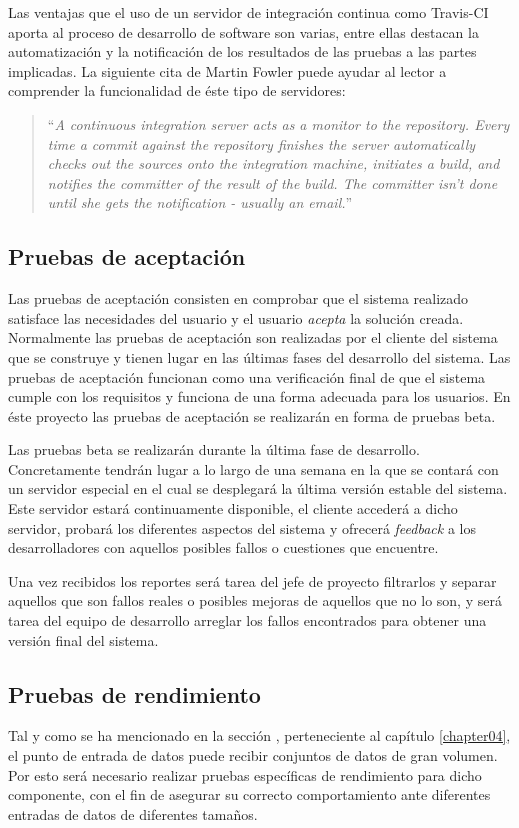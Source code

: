 Las ventajas que el uso de un servidor de integración continua como Travis-CI aporta al proceso de desarrollo de software son varias, entre ellas destacan la automatización y la notificación de los resultados de las pruebas a las partes implicadas.  La siguiente cita de Martin Fowler \cite{mfowler:continuous-integration} puede ayudar al lector a comprender la funcionalidad de éste tipo de servidores:
\begin{quote}
	``\textit{A continuous integration server acts as a monitor to the repository. Every time a commit against the repository finishes the server automatically checks out the sources onto the integration machine, initiates a build, and notifies the committer of the result of the build. The committer isn't done until she gets the notification - usually an email.}''
\end{quote}


\subsection{Pruebas de aceptación}
Las pruebas de aceptación consisten en comprobar que el sistema realizado satisface las necesidades del usuario y el usuario \textit{acepta} la solución creada.  Normalmente las pruebas de aceptación son realizadas por el cliente del sistema que se construye y tienen lugar en las últimas fases del desarrollo del sistema.  Las pruebas de aceptación funcionan como una verificación final de que el sistema cumple con los requisitos y funciona de una forma adecuada para los usuarios.
En éste proyecto las pruebas de aceptación se realizarán en forma de pruebas beta.

Las pruebas beta se realizarán durante la última fase de desarrollo.  Concretamente tendrán lugar a lo largo de una semana en la que se contará con un servidor especial en el cual se desplegará la última versión estable del sistema.  Este servidor estará continuamente disponible, el cliente accederá a dicho servidor, probará los diferentes aspectos del sistema y ofrecerá \textit{feedback} a los desarrolladores con aquellos posibles fallos o cuestiones que encuentre.

Una vez recibidos los reportes será tarea del jefe de proyecto filtrarlos y separar aquellos que son fallos reales o posibles mejoras de aquellos que no lo son, y será tarea del equipo de desarrollo arreglar los fallos encontrados para obtener una versión final del sistema.


\subsection{Pruebas de rendimiento}
Tal y como se ha mencionado en la sección , perteneciente al capítulo \ref{chapter04}, el punto de entrada de datos puede recibir conjuntos de datos de gran volumen.  Por esto será necesario realizar pruebas específicas de rendimiento para dicho componente, con el fin de asegurar su correcto comportamiento ante diferentes entradas de datos de diferentes tamaños.

